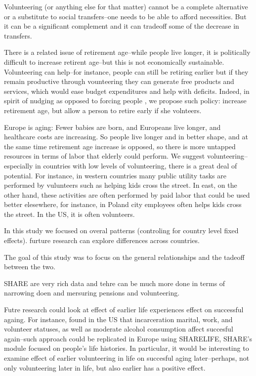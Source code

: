 \documentclass[10pt, letterpaper]{article}
\begin{document}
\begin{spacing}{1.4}
Volunteering (or anything else for that matter) cannot be a complete alternative
or a substitute to social transfers--one needs to be able to afford necessities.
But it can be a significant complement and it can tradeoff some of the decrease in transfers.

There is a related issue of retirement age--while people live longer, it is
 politically difficult to increase retirent age--but this is not economically
 sustainable. Volunteering can help--for instance, people can still be retiring
 earlier but if they remain productive through vounteering they can generate
 free products and services, which would ease budget expenditures and help with
 deficits. Indeed, in spirit of nudging as opposed to forcing people
 \citep{thaler08}, we propose such policy: increase retirement age, but allow a
 person to retire early if she volnteers.

Europe is aging: Fewer babies are born, and Europeans live longer, and healthcare
costs are increasing. So people live longer and in better shape, and at the same
time retirement age increase is opposed, so there is more untapped resources in
terms of labor that elderly could perform. We suggest volunteering--especially
in countries with low levels of volunteering, there is a great deal of potential.  
%
%
 For instance, in western countries many public utility tasks are performed by vulunteers such
as helping kids cross the street. In east, on the other hand, these activities
are often performed by paid labor that could be used better elesewhere, for
instance, in Poland %
 city employees often helps kids cross the street. %
 In the US, it is often volunteers.

In this study we focused on overal patterns (controling for country level fixed
effects). furture research can explore differences across countries. 

The goal of this study was to focus on the general relationships and the tadeoff between the two.

SHARE are very rich data and tehre can be much more done in terms of narrowing
doen and mersuring pensions and volunteering.

Futre research could look at effect of earlier life experiences effect on successful
againg. For instance, \citet{pruchno10} found in the US that incarceration
 marital, work, and volunteer statuses, as well as moderate
alcohol consumption affect succesful again--such approach could be
replicated in Europe using SHARELIFE, SHARE's module focused on people's life
histories. In particular, it would be interesting to examine effect of earlier
volunteering in life on succesful aging later--perhaps, not only
volunteering later in life, but also earlier has a positive effect. 


\end{spacing}
\end{document}
